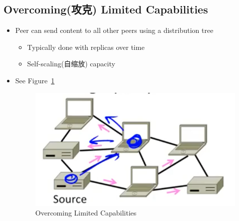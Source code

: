 \documentclass[12pt]{ctexart}   %
\begin{document}
	\subsection{Overcoming(攻克) Limited Capabilities}
	\begin{itemize}
		\item Peer can send content to all other peers using a distribution tree
		\begin{itemize}
			\item Typically done with replicas over time
			\item Self-scaling(自缩放) capacity
		\end{itemize}
		\item See Figure~\ref{fig:8-9-2}
		  
		 \begin{figure}[h!] %
		\centering
		 \includegraphics[scale=0.7]{images/8-9-2}
		\caption{ Overcoming Limited Capabilities }
		 \label{fig:8-9-2}
		 \end{figure}
	\end{itemize}
	
\end{document}
